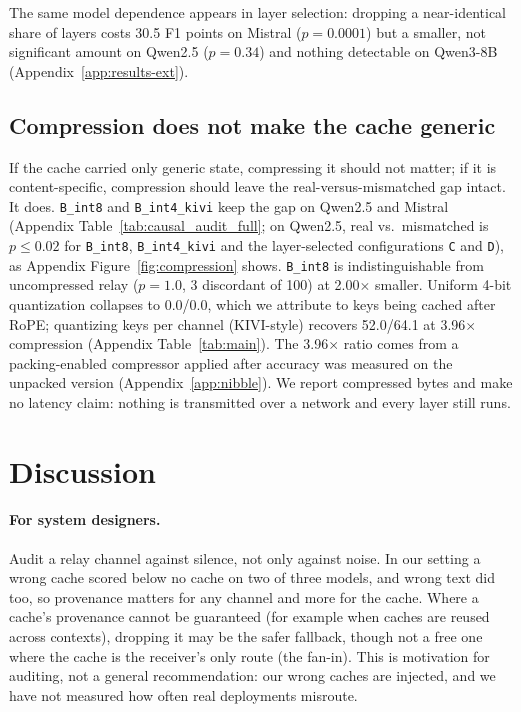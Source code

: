 \documentclass[11pt]{article}
\begin{document}
The same model dependence appears in layer selection: dropping a near-identical
share of layers costs 30.5 F1 points on Mistral ($p=0.0001$) but a smaller,
not significant amount on Qwen2.5 ($p=0.34$) and nothing detectable on
Qwen3-8B (Appendix~\ref{app:results-ext}).

\subsection{Compression does not make the cache generic}

If the cache carried only generic state, compressing it should not matter; if
it is content-specific, compression should leave the real-versus-mismatched gap
intact. It does. \texttt{B\_int8} and \texttt{B\_int4\_kivi} keep the gap on
Qwen2.5 and Mistral (Appendix Table~\ref{tab:causal_audit_full}; on Qwen2.5, real vs.\ mismatched is
$p\le0.02$ for \texttt{B\_int8}, \texttt{B\_int4\_kivi} and the layer-selected
configurations \texttt{C} and \texttt{D}), as Appendix Figure~\ref{fig:compression} shows.
\texttt{B\_int8} is indistinguishable from uncompressed relay ($p=1.0$, 3
discordant of 100) at 2.00$\times$ smaller. Uniform 4-bit quantization
collapses to 0.0/0.0, which we attribute to keys being cached after RoPE;
quantizing keys per channel (KIVI-style) recovers 52.0/64.1 at 3.96$\times$
compression (Appendix Table~\ref{tab:main}). The 3.96$\times$ ratio comes from a
packing-enabled compressor applied after accuracy was measured on the unpacked
version (Appendix~\ref{app:nibble}). We report compressed bytes and make no
latency claim: nothing is transmitted over a network and every layer still runs.



\section{Discussion}

\paragraph{For system designers.} Audit a relay channel against silence,
not only against noise. In our setting a wrong cache scored below no cache on two
of three models, and wrong text did too, so provenance matters for any channel and
more for the cache. Where a cache's provenance cannot be guaranteed (for example
when caches are reused across contexts), dropping it may be the safer fallback,
though not a free one where the cache is the receiver's only route (the fan-in).
This is motivation for auditing, not a general recommendation: our wrong caches
are injected, and we have not measured how often real deployments misroute.
\end{document}
